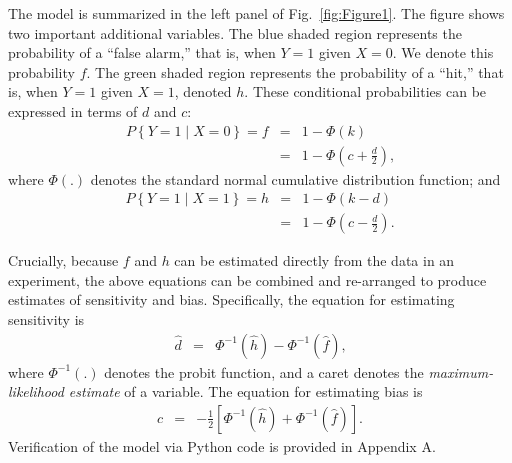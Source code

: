 \documentclass[man]{apa6}
\begin{document}
The model is summarized in the left panel of Fig.~\ref{fig:Figure1}. The figure shows two important additional variables. The blue shaded region represents the probability of a ``false alarm,'' that is, when $Y=1$ given $X=0$. We denote this probability $f$. The green shaded region represents the probability of a ``hit,'' that is, when $Y=1$ given $X=1$, denoted $h$. These conditional probabilities can be expressed in terms of $d$ and $c$:
\begin{eqnarray*}
P\left\{Y=1\mid{}X=0\right\}=f&=&1-\Phi\left(k\right)\\
&=&1-\Phi\left(c+\frac{d}{2}\right)\textrm{,}
\end{eqnarray*}where $\Phi\left(.\right)$ denotes the standard normal cumulative distribution function; and
\begin{eqnarray*}
P\left\{Y=1\mid{}X=1\right\}=h&=&1-\Phi\left(k-d\right)\\
&=&1-\Phi\left(c-\frac{d}{2}\right)\textrm{.}
\end{eqnarray*}


Crucially, because $f$ and $h$ can be estimated directly from the data in an experiment, the above equations can be combined and re-arranged to produce estimates of sensitivity and bias. Specifically, the equation for estimating sensitivity is
\begin{eqnarray}
\hat{d}&=&\Phi^{-1}\left(\hat{h}\right)-\Phi^{-1}\left(\hat{f}\right)\textrm{,}
\label{eq1}
\end{eqnarray}where $\Phi^{-1}\left(.\right)$ denotes the probit function, and a caret denotes the \emph{maximum-likelihood estimate} of a variable. The equation for estimating bias is
\begin{eqnarray}
\hat{c}&=&-\frac{1}{2}\left[\Phi^{-1}\left(\hat{h}\right)+\Phi^{-1}\left(\hat{f}\right)\right]\textrm{.}
\label{eq2}
\end{eqnarray}Verification of the model via Python code is provided in Appendix A.
\end{document}
